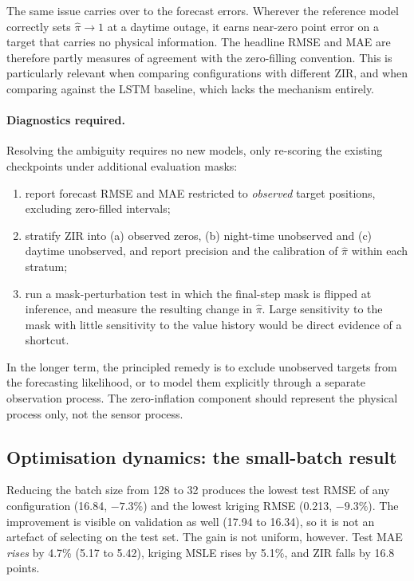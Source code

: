 The same issue carries over to the forecast errors. Wherever the
reference model correctly sets $\hat{\pi} \to 1$ at a daytime outage,
it earns near-zero point error on a target that carries no physical
information. The headline RMSE and MAE are therefore partly measures of
agreement with the zero-filling convention. This is particularly
relevant when comparing configurations with different ZIR, and
when comparing against the LSTM baseline, which lacks the mechanism
entirely.

\paragraph{Diagnostics required.}
Resolving the ambiguity requires no new models, only re-scoring the
existing checkpoints under additional evaluation masks:
\begin{enumerate}
    \item report forecast RMSE and MAE restricted to \emph{observed}
    target positions, excluding zero-filled intervals;
    \item stratify ZIR into (a) observed zeros, (b) night-time
    unobserved and (c) daytime unobserved, and report precision and the
    calibration of $\hat{\pi}$ within each stratum;
    \item run a mask-perturbation test in which the final-step mask is
    flipped at inference, and measure the resulting change in
    $\hat{\pi}$. Large sensitivity to the mask with little sensitivity
    to the value history would be direct evidence of a shortcut.
\end{enumerate}
In the longer term, the principled remedy is to exclude unobserved
targets from the forecasting likelihood, or to model them explicitly
through a separate observation process. The zero-inflation component
should represent the physical process only, not the sensor process.

\subsection{Optimisation dynamics: the small-batch result}
\label{sec:exp3-batch}

Reducing the batch size from 128 to 32 produces the lowest test RMSE
of any configuration (16.84, $-7.3\%$) and the lowest kriging RMSE
(0.213, $-9.3\%$). The improvement is visible on validation as well
(17.94 to 16.34), so it is not an artefact of selecting on the test
set. The gain is not uniform, however. Test MAE \emph{rises} by 4.7\%
(5.17 to 5.42), kriging MSLE rises by 5.1\%, and ZIR falls by
16.8 points.

